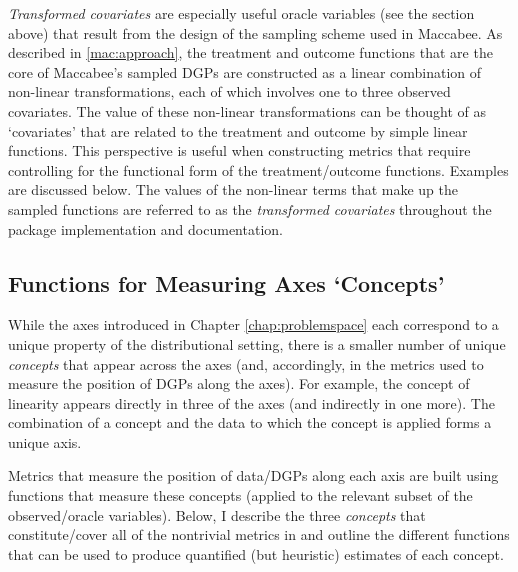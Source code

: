 \documentclass[../main.tex]{subfiles}
\begin{document}
\textit{Transformed covariates} are especially useful oracle variables (see the section above) that result from the design of the sampling scheme used in Maccabee. As described in \ref{mac:approach}, the treatment and outcome functions that are the core of Maccabee's sampled DGPs are constructed as a linear combination of non-linear transformations, each of which involves one to three observed covariates. The value of these non-linear transformations can be thought of as `covariates' that are related to the treatment and outcome by simple linear functions. This perspective is useful when constructing metrics that require controlling for the functional form of the treatment/outcome functions. Examples are discussed below. The values of the non-linear terms that make up the sampled functions are referred to as the \textit{transformed covariates} throughout the package implementation and documentation.

\subsection{Functions for Measuring Axes `Concepts'}

While the axes introduced in Chapter \ref{chap:problemspace} each correspond to a unique property of the distributional setting, there is a smaller number of unique \textit{concepts} that appear across the axes (and, accordingly, in the metrics used to measure the position of DGPs along the axes). For example, the concept of linearity appears directly in three of the axes (and indirectly in one more). The combination of a concept and the data to which the concept is applied forms a unique axis.

\vspace{\baselineskip}

Metrics that measure the position of data/DGPs along each axis are built using functions that measure these concepts (applied to the relevant subset of the observed/oracle variables). Below, I describe the three \textit{concepts} that constitute/cover all of the nontrivial metrics in \textcite{Dorie2019Automated1} and outline the different functions that can be used to produce quantified (but heuristic) estimates of each concept.
\end{document}
